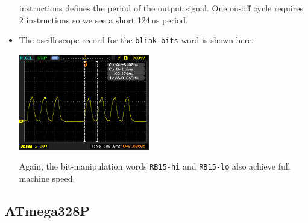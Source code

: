 \documentclass[12pt,a4paper]{article}
\newcommand{\code}[2]{
 \hrulefill
 \scriptsize
 
 \hrulefill
 \vspace{2em}
 \normalsize
}
\begin{document}
\begin{itemize}
  instructions defines the period of the output signal.
  One on-off cycle requires 2 instructions so we see a short 124\,ns period.
 \item The oscilloscope record for the \verb!blink-bits! word is shown here.
  \begin{center}
  \includegraphics[width=0.45\textwidth]{../figs/speed-test-named-bits-inlined-pic24fv32ka302.jpeg}
  \end{center}
  Again, the bit-manipulation words \verb!RB15-hi! and \verb!RB15-lo! also achieve full machine speed.
\end{itemize}


\subsection{ATmega328P}
%

\bigskip\noindent
\code{}{../avr8-2016/speed-test.txt}
\end{document}
